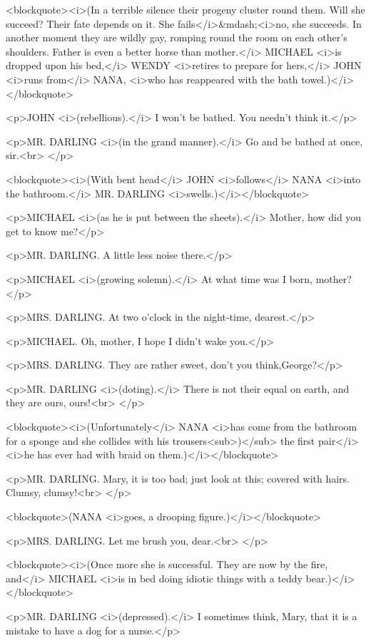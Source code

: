 <blockquote><i>(In a terrible silence their progeny cluster round
them. Will she succeed? Their fate depends on it. She
fails</i>&mdash;<i>no, she succeeds. In another moment they are
wildly gay, romping round the room on each other's shoulders. Father
is even a better horse than mother.</i> MICHAEL <i>is dropped upon
his bed,</i> WENDY <i>retires to prepare for hers,</i> JOHN <i>runs
from</i> NANA, <i>who has reappeared with the bath
towel.)</i></blockquote>

<p>JOHN <i>(rebellious).</i> I won't be bathed. You needn't think
it.</p>

<p>MR. DARLING <i>(in the grand manner).</i> Go and be bathed at
once, sir.<br>
</p>

<blockquote><i>(With bent head</i> JOHN <i>follows</i> NANA <i>into
the bathroom.</i> MR. DARLING <i>swells.)</i></blockquote>

<p>MICHAEL <i>(as he is put between the sheets).</i> Mother, how did
you get to know me?</p>

<p>MR. DARLING. A little less noise there.</p>

<p>MICHAEL <i>(growing solemn).</i> At what time was I born,
mother?</p>

<p>MRS. DARLING. At two o'clock in the night-time, dearest.</p>

<p>MICHAEL. Oh, mother, I hope I didn't wake you.</p>

<p>MRS. DARLING. They are rather sweet, don't you think,George?</p>

<p>MR. DARLING <i>(doting).</i> There is not their equal on earth,
and they are ours, ours!<br>
</p>

<blockquote><i>(Unfortunately</i> NANA <i>has come from the bathroom
for a sponge and she collides with his trousers<sub>)</sub> the first
pair</i> <i>he has ever had with braid on them.)</i></blockquote>

<p>MR. DARLING. Mary, it is too bad; just look at this; covered with
hairs. Clumsy, clumsy!<br>
</p>

<blockquote>(NANA <i>goes, a drooping figure.)</i></blockquote>

<p>MRS. DARLING. Let me brush you, dear.<br>
</p>

<blockquote><i>(Once more she is successful. They are now by the
fire, and</i> MICHAEL <i>is in bed doing idiotic things with a teddy
bear.)</i></blockquote>

<p>MR. DARLING <i>(depressed).</i> I sometimes think, Mary, that it
is a mistake to have a dog for a nurse.</p>

